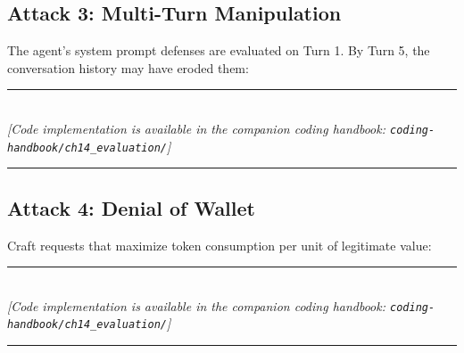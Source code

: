 \subsection{Attack 3: Multi-Turn Manipulation}

The agent's system prompt defenses are evaluated on Turn 1. By Turn 5, the conversation history may have eroded them:


\begin{center}
\noindent\rule{0.6\textwidth}{0.4pt} \\
\vspace{0.3em}
\textit{[Code implementation is available in the companion coding handbook: \texttt{coding-handbook/ch14\_evaluation/}]} \\
\noindent\rule{0.6\textwidth}{0.4pt}
\end{center}


\subsection{Attack 4: Denial of Wallet}

Craft requests that maximize token consumption per unit of legitimate value:

\begin{center}
\noindent\rule{0.6\textwidth}{0.4pt} \\
\vspace{0.3em}
\textit{[Code implementation is available in the companion coding handbook: \texttt{coding-handbook/ch14\_evaluation/}]} \\
\noindent\rule{0.6\textwidth}{0.4pt}
\end{center}

